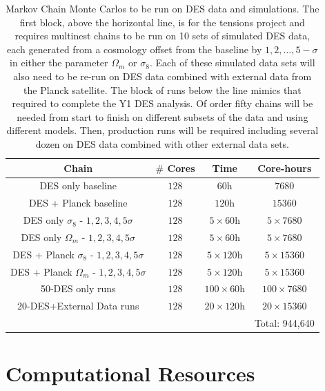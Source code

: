 \documentclass[12pt]{article}
\begin{document}
\begin{small}
\begin{table}[h!]
\begin{center}
\begin{tabular}{c|cc|c}
 Chain         & $\#$ Cores &  Time & Core-hours   \\ 
\hline
DES only baseline & $128$ & $60$h & $7680$  \\  
DES + Planck baseline & $128$ & $120$h & $15360$  \\  
DES only $\sigma_8$ - $1,2,3,4,5\sigma$ & $128$ & $5\times60$h & $5\times7680$  \\ 
DES only $\Omega_m$ - $1,2,3,4,5\sigma$ & $128$ & $5\times60$h & $5\times7680$  \\  
DES + Planck  $\sigma_8$ - $1,2,3,4,5\sigma$ & $128$ & $5\times120$h & $5\times15360$  \\ 
DES + Planck $\Omega_m$ - $1,2,3,4,5\sigma$ & $128$ & $5\times120$h & $5\times15360$  \\  
\hline
 50-DES only runs & $128$ & $100\times60$h & $100\times7680$  \\  
 20-DES+External Data runs & $128$ & $20\times120$h & $20\times15360$  \\  
\hline
& &  & Total: 944,640\\ 
\end{tabular}
\caption{Markov Chain Monte Carlos to be run on DES data and simulations. The first block, above the horizontal line, is for the tensions project and requires multinest chains to be run on 10 sets of simulated DES data, each generated from a cosmology offset from the baseline by $1,2,\ldots,5-\sigma$ in either the parameter $\Omega_m$ or $\sigma_8$. Each of these simulated data sets will also need to be re-run on DES data combined with external data from the Planck satellite. The block of runs below the line mimics that required to complete the Y1 DES analysis. Of order fifty chains will be needed from start to finish on different subsets of the data and using different models. Then, production runs will be required including several dozen on DES data combined with other external data sets.}
\label{tab:post}
\end{center}
\end{table}


\section{Computational Resources}


\end{small}
\end{document}
